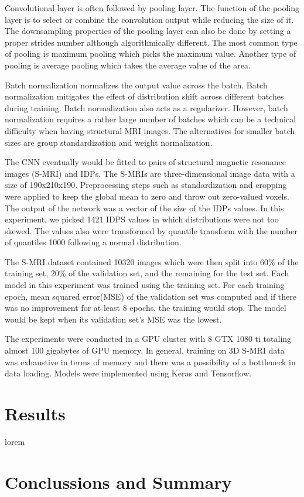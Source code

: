 \documentclass{article}
\begin{document}
    Convolutional layer is often followed by pooling layer. 
    The function of the pooling layer is to select or combine the convolution output while reducing the size of it. 
    The downsampling properties of the pooling layer can also be done by setting a proper strides number although algorithmically different. 
    The most common type of pooling is maximum pooling which picks the maximum value. 
    Another type of pooling is average pooling which takes the average value of the area. 

    Batch normalization normalizes the output value across the batch. 
    Batch normalization mitigates the effect of distribution shift across different batches during training. 
    Batch normalization also acts as a regularizer. 
    However, batch normalization requires a rather large number of batches which can be a technical difficulty when having structural-MRI images. 
    The alternatives for smaller batch sizes are group standardization and weight normalization.

    The CNN eventually would be fitted to pairs of structural magnetic resonance images (S-MRI) and IDPs. 
    The S-MRIs are three-dimensional image data with a size of 190x210x190. 
    Preprocessing steps such as standardization and cropping were applied to keep the global mean to zero and throw out zero-valued voxels. 
    The output of the network was a vector of the size of the IDPs values. 
    In this experiment, we picked 1421 IDPS values in which distributions were not too skewed. 
    The values also were transformed by quantile transform with the number of quantiles 1000 following a normal distribution. 

    The S-MRI dataset contained 10320 images which were then split into 60\% of the training set, 20\% of the validation set, and the remaining for the test set. 
    Each model in this experiment was trained using the training set. 
    For each training epoch, mean squared error(MSE) of the validation set was computed and if there was no improvement for at least 8 epochs, the training would stop. 
    The model would be kept when its validation set’s MSE was the lowest.

    The experiments were conducted in a GPU cluster with 8 GTX 1080 ti totaling almost 100 gigabytes of GPU memory. 
    In general, training on 3D S-MRI data was exhaustive in terms of memory and there was a possibility of a bottleneck in data loading. 
    Models were implemented using Keras and Tensorflow.
    \section*{Results}
    lorem
    \section*{Conclussions and Summary}

    \printbibliography
\end{document}
